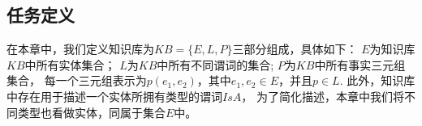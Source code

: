 
\subsection{任务定义}
\label{sec:schema-problem}


\begin{definition}

在本章中，我们定义知识库为$KB=\{E, L, P\}$三部分组成，具体如下：
$E$为知识库$KB$中所有实体集合；
$L$为$KB$中所有不同谓词的集合;
$P$为$KB$中所有事实三元组集合，
每一个三元组表示为$p(e_1, e_2)$，其中$e_1, e_2 \in E$，并且$p \in L$.
此外，知识库中存在用于描述一个实体所拥有类型的谓词$IsA$，
为了简化描述，本章中我们将不同类型也看做实体，同属于集合$E$中。

\end{definition}




